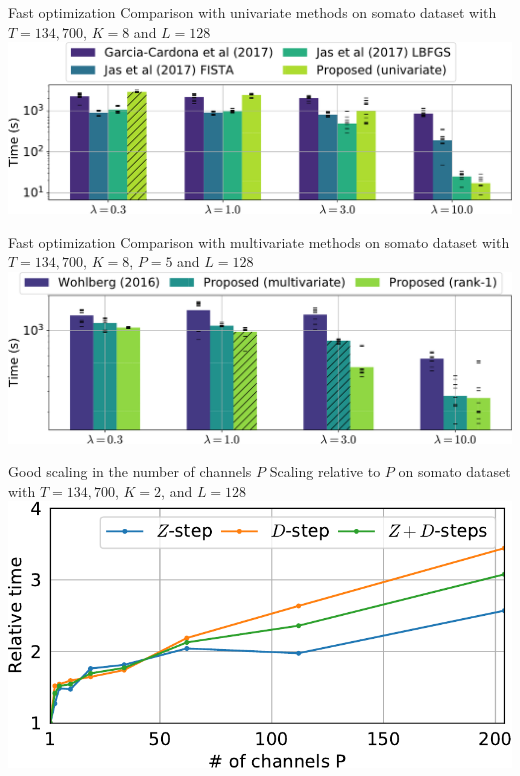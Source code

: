 \documentclass{beamer}
\begin{document}
\begin{frame}{Fast optimization}
Comparison with univariate methods on somato dataset with $T=134,700$, $K=8$ and $L=128$\\[1em]
\includegraphics[width=\textwidth]{all_last_0001_T_13470_P1_K8_L128}
\end{frame}

\begin{frame}{Fast optimization}
Comparison with multivariate methods on somato dataset with $T=134,700$, $K=8$, $P=5$ and $L=128$\\[1em]
\includegraphics[width=\textwidth]{all_last_0001_T_13470_P5_K8_L128}
\end{frame}

\begin{frame}{Good scaling in the number of channels $P$}
Scaling relative to $P$ on somato dataset with $T=134,700$, $K=2$, and $L=128$\\[1em]
\includegraphics[width=\textwidth]{scaling_channels_reg0_001_mean_rank1_K2_L128.pdf}
\end{frame}
\end{document}
